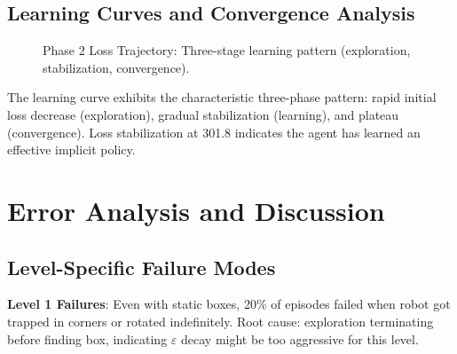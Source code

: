 \documentclass[12pt,a4paper]{article}
\begin{document}
\subsection{Learning Curves and Convergence Analysis}

\begin{figure}[H]
\centering
{}
\caption{Phase 2 Loss Trajectory: Three-stage learning pattern (exploration, stabilization, convergence).}
\end{figure}

The learning curve exhibits the characteristic three-phase pattern: rapid initial loss decrease (exploration), gradual stabilization (learning), and plateau (convergence). Loss stabilization at 301.8 indicates the agent has learned an effective implicit policy.

\section{Error Analysis and Discussion}

\subsection{Level-Specific Failure Modes}

\textbf{Level 1 Failures}: Even with static boxes, 20\% of episodes failed when robot got trapped in corners or rotated indefinitely. Root cause: exploration terminating before finding box, indicating $\varepsilon$ decay might be too aggressive for this level.
\end{document}
